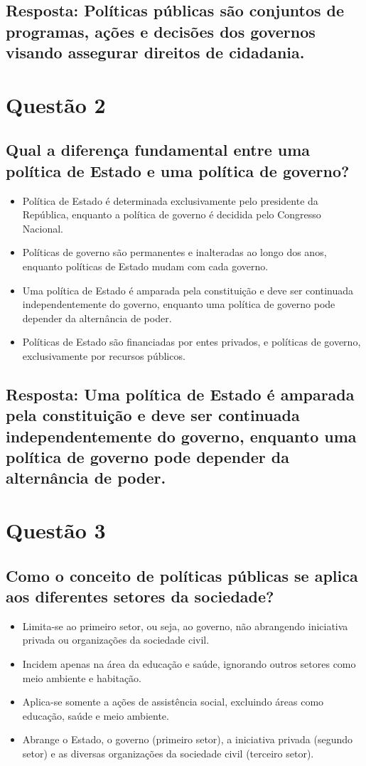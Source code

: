 \documentclass[
   article,       
   12pt,          
   oneside,       
   a4paper,       
   english,       
   brazil,        
   sumario=tradicional
   ]{abntex2}
\begin{document}
\subsection{Resposta: Políticas públicas são conjuntos de programas, ações e decisões dos governos visando assegurar direitos de cidadania.}

\section{Questão 2}
\subsection{Qual a diferença fundamental entre uma política de Estado e uma política de governo?}
\begin{itemize}
    \item Política de Estado é determinada exclusivamente pelo presidente da República, enquanto a política de governo é decidida pelo Congresso Nacional.
    \item Políticas de governo são permanentes e inalteradas ao longo dos anos, enquanto políticas de Estado mudam com cada governo.
    \item Uma política de Estado é amparada pela constituição e deve ser continuada independentemente do governo, enquanto uma política de governo pode depender da alternância de poder.
    \item Políticas de Estado são financiadas por entes privados, e políticas de governo, exclusivamente por recursos públicos.
\end{itemize}
\subsection{Resposta: Uma política de Estado é amparada pela constituição e deve ser continuada independentemente do governo, enquanto uma política de governo pode depender da alternância de poder.}

\section{Questão 3}
\subsection{Como o conceito de políticas públicas se aplica aos diferentes setores da sociedade?}
\begin{itemize}
    \item Limita-se ao primeiro setor, ou seja, ao governo, não abrangendo iniciativa privada ou organizações da sociedade civil.
    \item Incidem apenas na área da educação e saúde, ignorando outros setores como meio ambiente e habitação.
    \item Aplica-se somente a ações de assistência social, excluindo áreas como educação, saúde e meio ambiente.
    \item Abrange o Estado, o governo (primeiro setor), a iniciativa privada (segundo setor) e as diversas organizações da sociedade civil (terceiro setor).
\end{itemize}
\end{document}
